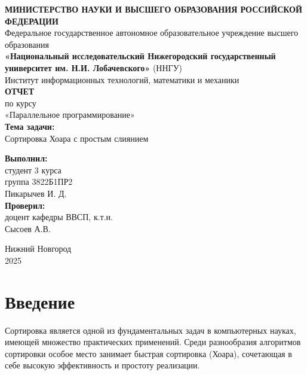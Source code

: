 \documentclass[a4paper,12pt]{article}
\begin{document}
\begin{titlepage}
\begin{center}

\onehalfspacing

\textbf{МИНИСТЕРСТВО НАУКИ И ВЫСШЕГО ОБРАЗОВАНИЯ РОССИЙСКОЙ ФЕДЕРАЦИИ} \\[0.3cm]
Федеральное государственное автономное образовательное учреждение высшего образования \\[0.3cm]
\textbf{«Национальный исследовательский Нижегородский государственный университет им. Н.И. Лобачевского»} (ННГУ) \\[0.3cm]
Институт информационных технологий, математики и механики \\[2cm]

{\Large \textbf{ОТЧЕТ}} \\[0.5cm]
по курсу \\[0.3cm]
{\large «Параллельное программирование»} \\[1cm]

\textbf{Тема задачи:} \\[0.3cm]
{\large Сортировка Хоара с простым слиянием} \\

\vfill
\begin{flushright}
\textbf{Выполнил:} \\
студент 3 курса \\
группа 3822Б1ПР2 \\
Пикарычев И. Д.  \\[1cm]

\textbf{Проверил:} \\
доцент кафедры ВВСП, к.т.н. \\ 
Сысоев А.В.
\end{flushright}

\vfill

Нижний Новгород \\
2025

\end{center}
\end{titlepage}

\newpage

\onehalfspacing

\section{Введение}
Сортировка является одной из фундаментальных задач в компьютерных науках, имеющей множество практических применений. 
Среди разнообразия алгоритмов сортировки особое место занимает быстрая сортировка (Хоара), сочетающая в себе высокую эффективность и простоту реализации.
\end{document}
